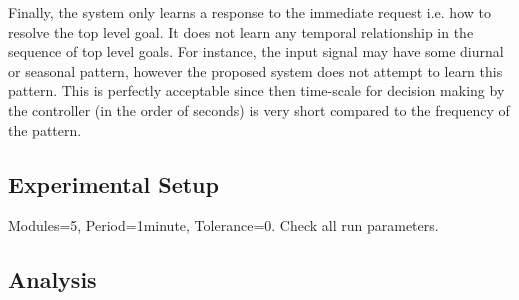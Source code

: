 Finally, the system only learns a response to the immediate request i.e. how to resolve the top level goal. It does not learn any temporal relationship in the sequence of top level goals. For instance, the input signal may have some diurnal or seasonal pattern, however the proposed system does not attempt to learn this pattern. This is perfectly acceptable since then time-scale for decision making by the controller (in the order of seconds) is very short compared to the frequency of the pattern.

\subsection{Experimental Setup}\label{experiments}

Modules=5, Period=1minute, Tolerance=0. Check all run parameters.

\subsection{Analysis}\label{analysis}


